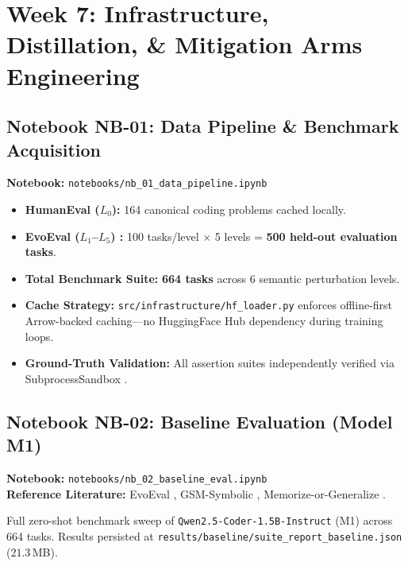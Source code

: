 \documentclass[12pt, a4paper]{article}
\begin{document}
\section{Week 7: Infrastructure, Distillation, \& Mitigation Arms Engineering}

\subsection{Notebook NB-01: Data Pipeline \& Benchmark Acquisition}
\textbf{Notebook:} \texttt{notebooks/nb\_01\_data\_pipeline.ipynb}

\begin{researchbox}[title={\faDatabase\ NB-01 Acquisition Statistics}]
\begin{itemize}[leftmargin=*]
  \item \textbf{HumanEval ($L_0$):} 164 canonical coding problems cached locally.
  \item \textbf{EvoEval ($L_1$--$L_5$) \cite{evoeval}:} 100 tasks/level $\times$ 5 levels = \textbf{500 held-out evaluation tasks}.
  \item \textbf{Total Benchmark Suite:} \textbf{664 tasks} across 6 semantic perturbation levels.
  \item \textbf{Cache Strategy:} \texttt{src/infrastructure/hf\_loader.py} enforces offline-first Arrow-backed caching---no HuggingFace Hub dependency during training loops.
  \item \textbf{Ground-Truth Validation:} All assertion suites independently verified via SubprocessSandbox \cite{livecodebench}.
\end{itemize}
\end{researchbox}

\subsection{Notebook NB-02: Baseline Evaluation (Model M1)}
\textbf{Notebook:} \texttt{notebooks/nb\_02\_baseline\_eval.ipynb}\\
\textbf{Reference Literature:} EvoEval \cite{evoeval}, GSM-Symbolic \cite{gsm_symbolic}, Memorize-or-Generalize \cite{memorize_or_generalize}.

Full zero-shot benchmark sweep of \texttt{Qwen2.5-Coder-1.5B-Instruct} (M1) across 664 tasks.
Results persisted at \texttt{results/baseline/suite\_report\_baseline.json} ($21.3$\,MB).
\end{document}
